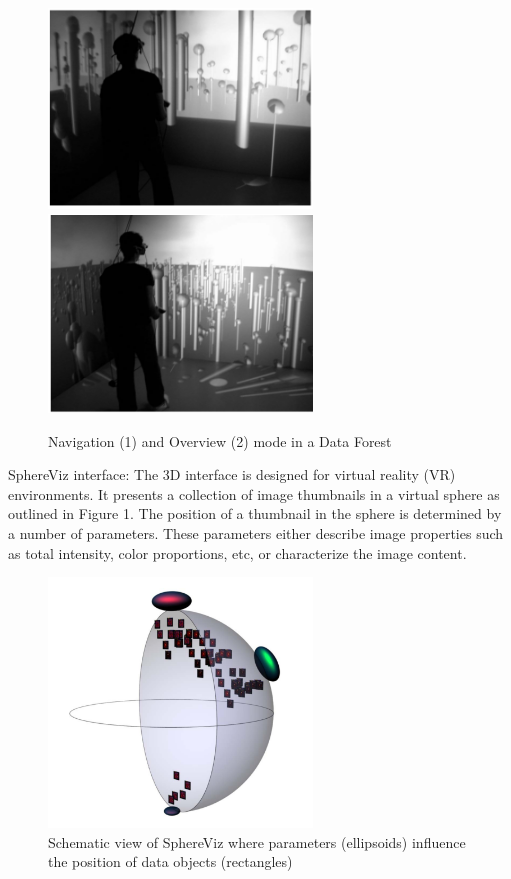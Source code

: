 \begin{figure}[h]
	\begin{center}
		\includegraphics[width=7cm]{03_Figures/05_LitReview/Jamieson2007_DataTree.png}
		\includegraphics[width=7cm]{03_Figures/05_LitReview/Jamieson2007_DataTreeOverview.png}
		\caption[Navigation and Overview mode in a Data Forest]{Navigation (1) and Overview (2) mode in a Data Forest \citep{Jamieson2007}}
		\label{fig:datatrees}
	\end{center}
\end{figure} 

SphereViz interface: The 3D interface is designed for virtual reality (VR) environments. It presents a collection of image thumbnails in a virtual sphere as outlined in Figure 1. The position of a thumbnail in the sphere is determined by a number of parameters. These parameters either describe image properties such as total intensity, color proportions, etc, or characterize the image content.
\cite{Soldati2007}

\begin{figure}[h]
	\begin{center}
		\includegraphics[width=7cm]{03_Figures/05_LitReview/Soldati2007_SphereViz.png}
		\caption[Schematic view of SphereViz where parameters influence the position of data objects]{Schematic view of SphereViz where parameters (ellipsoids) influence the position of data objects (rectangles) \citep{Soldati2007}}
		\label{fig:sphereviz}
	\end{center}
\end{figure} 


